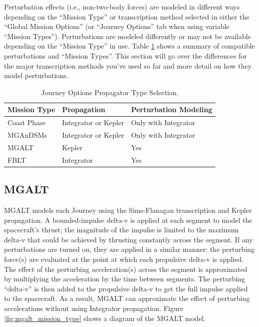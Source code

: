 \documentclass[11pt]{article}
\begin{document}
\noindent Perturbation effects (i.e., non-two-body forces) are modeled in different ways depending on the ``Mission Type'' or transcription method selected in either the ``Global Mission Options'' (or ``Journey Options'' tab when using variable ``Mission Types''). Perturbations are modeled differently or may not be available depending on the ``Mission Type'' in use. Table \ref{tab:prop_and_preturb_options} shows a summary of compatible perturbations and ``Mission Types''. This section will go over the differences for the major transcription methods you’ve used so far and more detail on how they model perturbations.

\begin{table}[H]
	\begin{small}
		\begin{tabularx}{\linewidth} { >{\arraybackslash} X >{\arraybackslash} X >{\arraybackslash} X}
			\hline
			Mission Type & Propagation & Perturbation Modeling \\
			\hline 
			Coast Phase & Integrator or Kepler & Only with Integrator \\ 
			\ac{MGAnDSMs} & Integrator or Kepler & Only with Integrator \\ 
			\ac{MGALT} & Kepler & Yes \\
			\ac{FBLT} & Integrator & Yes \\
 			\hline
		\end{tabularx}
	\end{small}
	\caption{\label{tab:prop_and_preturb_options}Journey Options Propagator Type Selection.}
\end{table}

\subsection{MGALT}
\label{sec:mgalt}

\acf{MGALT} models each Journey using the Sims-Flanagan transcription and Kepler propagation. A bounded-impulse delta-v is applied at each segment to model the spacecraft’s thrust; the magnitude of the impulse is limited to the maximum delta-v that could be achieved by thrusting constantly across the segment. If any perturbations are turned on, they are applied in a similar manner: the perturbing force(s) are evaluated at the point at which each propulsive delta-v is applied. The effect of the perturbing acceleration(s) across the segment is approximated by multiplying the acceleration by the time between segments. The perturbing ``delta-v'' is then added to the propulsive delta-v to get the full impulse applied to the spacecraft. As a result, \ac{MGALT} can approximate the effect of perturbing accelerations without using Integrator propagation. Figure \ref{fig:mgalt_mission_type} shows a diagram of the \ac{MGALT} model.
\end{document}
